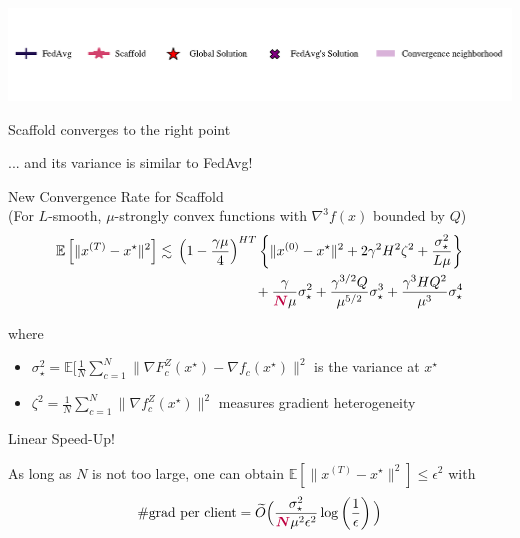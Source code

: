 \documentclass[aspectratio=169,12pt]{beamer}
\begin{document}
\begin{frame}[t]
\begin{center}
\vspace{-3em}

\includegraphics[width=\linewidth]{images/legend_fedavg_scaffold.pdf}    

\end{center}

  \vspace{-3em}
  \begin{center}
    Scaffold converges to the right point


    ... and its variance is similar to FedAvg!
  \end{center}


\end{frame}


\begin{frame}{New Convergence Rate for Scaffold\\[-0.5em]
    \small (For $L$-smooth, $\mu$-strongly convex functions with $\nabla^3 f(x)$ bounded by $Q$)}
\begin{align*}
\mathbb{E}\left[ \| x^{(T)} - x^\star \|^2 \right] 
& \lesssim{} \left( 1 - \frac{\gamma \mu}{4} \right)^{HT}
\left\{ 
\| x^{(0)} - x^\star \|^2
+
2\gamma^2 H^2 \zeta^2
+
\frac{ \sigma_\star^2 }{L\mu}
\right\}
\\ &  \quad\quad\quad\quad\quad\quad\quad
+ 
\frac{\gamma }{\textcolor{purple}{\boldsymbol{N}} \mu} \sigma_\star^2 
+ \frac{ \gamma^{3/2} Q }{\mu^{5/2}} \sigma_\star^3
+ \frac{ \gamma^3 H Q^2}{\mu^3} \sigma_\star^4
\end{align*}


where
\begin{itemize}
\item \small
  $\sigma_\star^2 = \mathbb{E}[ \frac{1}{N} \sum_{c=1}^N \| \nabla F_c^Z(x^\star) - \nabla f_c(x^\star) \|^2$ is the variance at $x^\star$
\item \small
  $\zeta^2 = \frac{1}{N} \sum_{c=1}^N \| \nabla f_c^Z(x^\star) \|^2$ measures gradient heterogeneity
\end{itemize}



\end{frame}

\begin{frame}{Linear Speed-Up!}

  As long as $N$ is not too large, one can obtain $\mathbb{E}\left[ \| x^{(T)} - x^\star \|^2 \right] \le \epsilon^2 $ with
  \begin{align*}
    \# \text{grad per client}
    = \widetilde O\Big( \frac{\sigma_\star^2}{\textcolor{purple}{\boldsymbol{N}} \mu^2 \epsilon^2} 
    \log\left( 
    \frac{1}{\epsilon}
    \right) \Big)
  \end{align*}
  
\end{frame}
\end{document}
